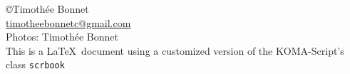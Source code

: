 	\clearpage
\begin{titlepage}
	\thispagestyle{empty}

\null\vfill
\noindent \copyright  Timoth\'ee Bonnet\\
\href{mailto:timotheebonnetc@gmail.com}{timotheebonnetc@gmail.com}\\
Photos: Timoth\'ee Bonnet\\
This is a \LaTeX ~document using a customized version of the KOMA-Script's class \texttt{scrbook}
\end{titlepage}